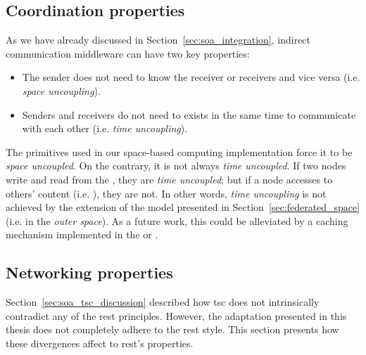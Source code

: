 \subsection{Coordination properties}
\label{sec:coordination_properties}

As we have already discussed in Section~\ref{sec:soa_integration}, indirect communication middleware can have two key properties:
\begin{itemize}
  \item The sender does not need to know the receiver or receivers and vice versa (i.e. \emph{space uncoupling}).
  \item Senders and receivers do not need to exists in the same time to communicate with each other (i.e. \emph{time uncoupling}).
\end{itemize}


The primitives used in our space-based computing implementation force it to be \emph{space uncoupled}.
On the contrary, it is not always \emph{time uncoupled}.
If two nodes write and read from the \coordspace{}, they are \emph{time uncoupled};
but if a node accesses to others' content (i.e. \selfgraphs{}), they are not.
In other words, \emph{time uncoupling} is not achieved by the extension of the model presented in Section~\ref{sec:federated_space} (i.e. in the \emph{outer space}).
As a future work, this could be alleviated by a caching mechanism implemented in the \coordinator{} or \coordinators{}. %




\subsection{Networking properties} %
\label{sec:network_properties}

Section~\ref{sec:soa_tsc_discussion} described how \ac{tsc} does not intrinsically contradict any of the \ac{rest} principles.
However, the adaptation presented in this thesis does not completely adhere to the \ac{rest} style.
This section presents how these divergences affect to \ac{rest}'s properties.


